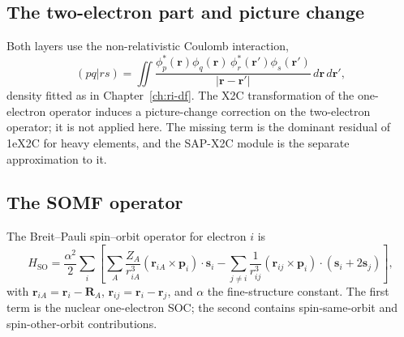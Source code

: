 \subsection{The two-electron part and picture change}

Both layers use the non-relativistic Coulomb interaction,
\begin{equation}
  (pq|rs)=\iint
  \frac{\phi_p^{*}(\mathbf r)\phi_q(\mathbf r)\,
        \phi_r^{*}(\mathbf r')\phi_s(\mathbf r')}
       {|\mathbf r-\mathbf r'|}
  \,d\mathbf r\,d\mathbf r',
  \label{eq:x2c-coulomb}
\end{equation}
density fitted as in Chapter~\ref{ch:ri-df}.  The X2C transformation of
the one-electron operator induces a picture-change correction on the
two-electron operator; it is not applied here.  The missing term is the
dominant residual of 1eX2C for heavy elements, and the SAP-X2C module
is the separate approximation to it.

\subsection{The SOMF operator}

The Breit--Pauli spin--orbit operator for electron $i$ is
\begin{equation}
  H_{\mathrm{SO}}
  = \frac{\alpha^{2}}{2}\sum_i\left[
      \sum_A \frac{Z_A}{r_{iA}^{3}}
      \left(\mathbf r_{iA}\times\mathbf p_i\right)\cdot\mathbf s_i
      - \sum_{j\neq i}\frac{1}{r_{ij}^{3}}
      \left(\mathbf r_{ij}\times\mathbf p_i\right)
      \cdot\left(\mathbf s_i+2\mathbf s_j\right)
    \right],
  \label{eq:x2c-breit-pauli}
\end{equation}
with $\mathbf r_{iA}=\mathbf r_i-\mathbf R_A$,
$\mathbf r_{ij}=\mathbf r_i-\mathbf r_j$, and
$\alpha$ the fine-structure constant.  The first term is the nuclear
one-electron SOC; the second contains spin-same-orbit and
spin-other-orbit contributions.

